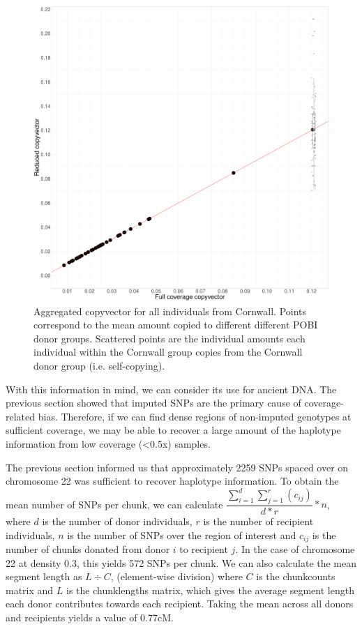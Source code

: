 \begin{figure}[htp]
    \centering
    \includegraphics[width=1.0\textwidth]{../images/chapter1/dense_sparse_devon_cornwall_collapsed_scatterpoints.pdf}
    \caption{Aggregated copyvector for all individuals from Cornwall. Points correspond to the mean amount copied to different different POBI donor groups. Scattered points are the individual amounts each individual within the Cornwall group copies from the Cornwall donor group (i.e. self-copying).}
    \label{fig:dense_sparse_devon_cornwall_collapsed_scatterpoints}
\end{figure}

With this information in mind, we can consider its use for ancient DNA. The previous section showed that imputed SNPs are the primary cause of coverage-related bias. Therefore, if we can find dense regions of non-imputed genotypes at sufficient coverage, we may be able to recover a large amount of the haplotype information from low coverage (<0.5x) samples.

The previous section informed us that approximately 2259 SNPs spaced over on chromosome 22 was sufficient to recover haplotype information. To obtain the mean number of SNPs per chunk, we can calculate $\dfrac{\sum_{i=1}^{d} \sum_{j=1}^{r} (c_{ij})}{d*r} * n$, where $d$ is the number of donor individuals, $r$ is the number of recipient individuals, $n$ is the number of SNPs over the region of interest and $c_{ij}$ is the number of chunks donated from donor $i$ to recipient $j$. In the case of chromosome 22 at density 0.3, this yields 572 SNPs per chunk. We can also calculate the mean segment length as $L \div C$, (element-wise division) where $C$ is the chunkcounts matrix and $L$ is the  chunklengths matrix, which gives the average segment length each donor contributes towards each recipient. Taking the mean across all donors and recipients yields a value of 0.77cM. 

